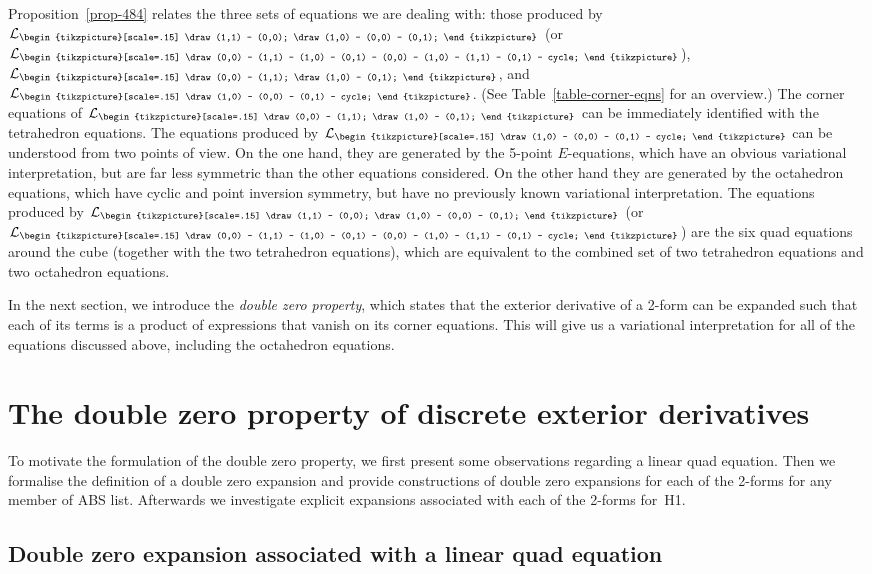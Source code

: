 \documentclass[10pt,a4paper]{amsart}
\newcommand{\crosssquare}{{\begin{tikzpicture}[scale=.15]
			\draw (0,0) -- (1,1) -- (1,0) -- (0,1) -- (0,0) -- (1,0) -- (1,1) -- (0,1) -- cycle;
\end{tikzpicture}}}
\newcommand{\cross}{{\begin{tikzpicture}[scale=.15]
			\draw (0,0) -- (1,1);
			\draw (1,0) -- (0,1);
\end{tikzpicture}}}
\newcommand{\triang}{{\begin{tikzpicture}[scale=.15]
			\draw (1,0) -- (0,0) -- (0,1) -- cycle;
\end{tikzpicture}}}
\newcommand{\trileg}{{\begin{tikzpicture}[scale=.15]
			\draw (1,1) -- (0,0);
			\draw (1,0) -- (0,0) -- (0,1);
\end{tikzpicture}}}
\newcommand{\cL}{\mathcal{L}}
\numberwithin{equation}{section}
\begin{document}
Proposition~\ref{prop-484} relates the three sets of equations we are dealing with: those produced by~$\cL_\trileg$ (or $\cL_\crosssquare$), $\cL_\cross$, and $\cL_\triang$. (See Table~\ref{table-corner-eqns} for an overview.)
The corner equations of $\cL_\cross$ can be immediately identified with the tetrahedron equations.
The equations produced by $\cL_\triang$ can be understood from two points of view. On the one hand, they are generated by the 5-point $E$-equations, which have an obvious variational interpretation, but are far less symmetric than the other equations considered. On the other hand they are generated by the octahedron equations, which have cyclic and point inversion symmetry, but have no previously known variational interpretation.
The equations produced by $\cL_\trileg$ (or $\cL_\crosssquare$) are the six quad equations around the cube (together with the two tetrahedron equations), which are equivalent to the combined set of two tetrahedron equations and two octahedron equations.

In the next section, we introduce the \emph{double zero property}, which states that the exterior derivative of a 2-form can be expanded such that each of its terms is a product of expressions that vanish on its corner equations. This will give us a variational interpretation for all of the equations discussed above, including the octahedron equations.


\section{The double zero property of discrete exterior derivatives}
\label{sec-double0}

To motivate the formulation of the double zero property, we first present some observations regarding a linear quad equation. Then we formalise the definition of a double zero expansion and provide constructions of double zero expansions for each of the 2-forms for any member of ABS list. Afterwards we investigate explicit expansions associated with each of the 2-forms for~H1.

\subsection{Double zero expansion associated with a linear quad equation}
\end{document}
